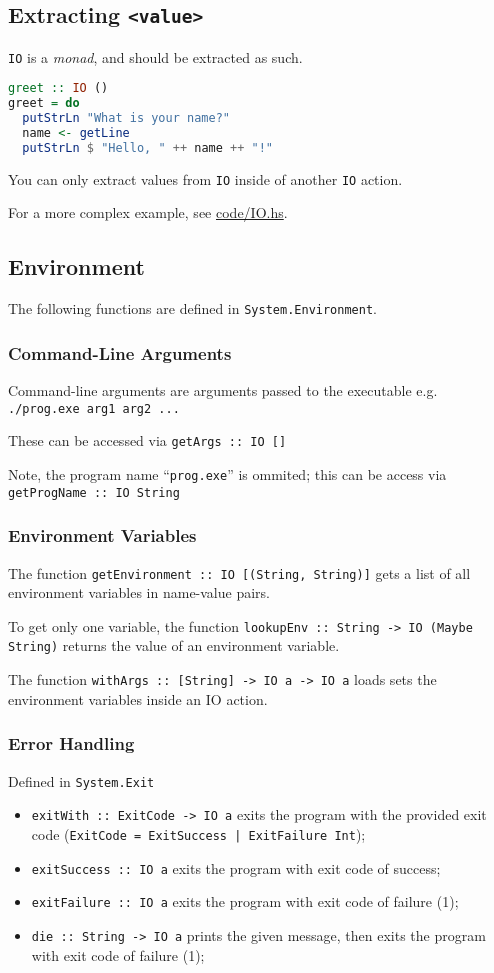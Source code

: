 \subsection{Extracting \texttt{<value>}}
\texttt{IO} is a \textit{monad}, and should be extracted as such.
\begin{lstlisting}[language=haskell]
greet :: IO ()
greet = do
  putStrLn "What is your name?"
  name <- getLine
  putStrLn $ "Hello, " ++ name ++ "!"
\end{lstlisting}

You can only extract values from \texttt{IO} inside of another \texttt{IO} action.

For a more complex example, see \url{code/IO.hs}.

\subsection{Environment}
The following functions are defined in \texttt{System.Environment}.

\subsubsection{Command-Line Arguments}
Command-line arguments are arguments passed to the executable e.g. \texttt{./prog.exe arg1 arg2 ...}

These can be accessed via \texttt{getArgs :: IO []}

Note, the program name ``\texttt{prog.exe}'' is ommited; this can be access via \texttt{getProgName :: IO String}

\subsubsection{Environment Variables}
The function \texttt{getEnvironment :: IO [(String, String)]} gets a list of all environment variables in name-value pairs.

To get only one variable, the function \texttt{lookupEnv :: String -> IO (Maybe String)} returns the value of an environment variable.

The function \texttt{withArgs :: [String] -> IO a -> IO a} loads sets the environment variables inside an IO action.

\subsubsection{Error Handling}
Defined in \texttt{System.Exit}

\begin{itemize}
  \item \texttt{exitWith :: ExitCode -> IO a} exits the program with the provided exit code (\texttt{ExitCode = ExitSuccess | ExitFailure Int});
  \item \texttt{exitSuccess :: IO a} exits the program with exit code of success;
  \item \texttt{exitFailure :: IO a} exits the program with exit code of failure (1);
  \item \texttt{die :: String -> IO a} prints the given message, then exits the program with exit code of failure (1);
\end{itemize}